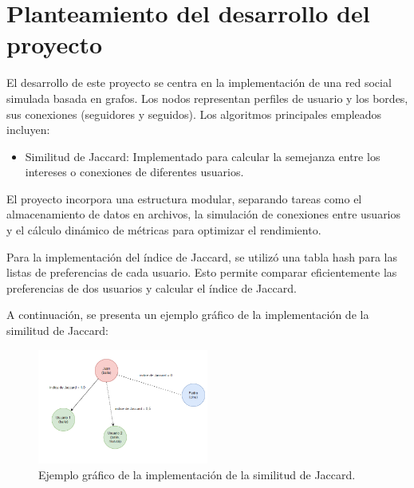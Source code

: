 \section{Planteamiento del desarrollo del proyecto}
El desarrollo de este proyecto se centra en la implementación de una red social simulada basada en grafos. Los nodos representan perfiles de usuario y los bordes, sus conexiones (seguidores y seguidos). Los algoritmos principales empleados incluyen:

\begin{itemize}
    \item Similitud de Jaccard: Implementado para calcular la semejanza entre los intereses o conexiones de diferentes usuarios.
\end{itemize}

El proyecto incorpora una estructura modular, separando tareas como el almacenamiento de datos en archivos, la simulación de conexiones entre usuarios y el cálculo dinámico de métricas para optimizar el rendimiento.

Para la implementación del índice de Jaccard, se utilizó una tabla hash para las listas de preferencias de cada usuario. Esto permite comparar eficientemente las preferencias de dos usuarios y calcular el índice de Jaccard.

A continuación, se presenta un ejemplo gráfico de la implementación de la similitud de Jaccard:


\begin{figure}[H]
    \centering
    \includegraphics[width=0.5\textwidth]{src/figures/Jaccard.png}
    \caption{Ejemplo gráfico de la implementación de la similitud de Jaccard.}
    \label{fig:uniqueJaccard}
\end{figure}